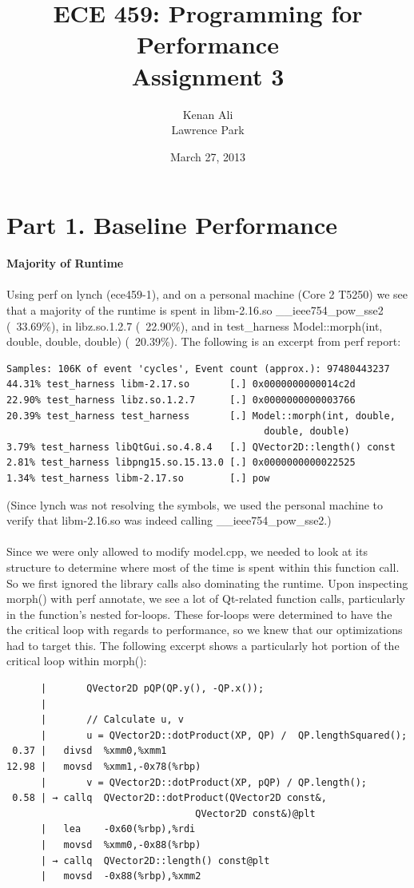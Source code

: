 \documentclass[12pt]{article}
\title{ECE 459: Programming for Performance\\Assignment 3}
\author{Kenan Ali\\Lawrence Park}
\date{March 27, 2013}
\begin{document}
\maketitle

\section*{Part 1. Baseline Performance}
{\bf Majority of Runtime}
\\
\\
Using perf on lynch (ece459-1), and on a personal machine (Core 2 T5250) we see that a majority of the
runtime is spent in libm-2.16.so \_\_ieee754\_pow\_sse2 (~33.69\%), in libz.so.1.2.7 (~22.90\%), and in
test\_harness Model::morph(int, double, double, double) (~20.39\%). The following is an excerpt from perf
report:
\\
\begin{lstlisting}
Samples: 106K of event 'cycles', Event count (approx.): 97480443237
44.31% test_harness libm-2.17.so       [.] 0x0000000000014c2d
22.90% test_harness libz.so.1.2.7      [.] 0x0000000000003766
20.39% test_harness test_harness       [.] Model::morph(int, double,
                                             double, double)
3.79% test_harness libQtGui.so.4.8.4   [.] QVector2D::length() const
2.81% test_harness libpng15.so.15.13.0 [.] 0x0000000000022525
1.34% test_harness libm-2.17.so        [.] pow
\end{lstlisting}

(Since lynch was not resolving the symbols, we used the personal machine to verify that libm-2.16.so was
indeed calling \_\_ieee754\_pow\_sse2.)
\\
\\
Since we were only allowed to modify model.cpp, we needed to look at its structure to determine where
most of the time is spent within this function call. So we first ignored the library calls also dominating the
runtime. Upon inspecting morph() with perf annotate, we see a lot of Qt-related function calls, particularly in
the function's nested for-loops. These for-loops were determined to have the the critical loop with regards
to performance, so we knew that our optimizations had to target this.
The following excerpt shows a particularly hot portion of the critical loop within morph():
\newpage
\begin{lstlisting}
      |       QVector2D pQP(QP.y(), -QP.x()); 
      |                                                  
      |       // Calculate u, v 
      |       u = QVector2D::dotProduct(XP, QP) /  QP.lengthSquared(); 
 0.37 |   divsd  %xmm0,%xmm1   
12.98 |   movsd  %xmm1,-0x78(%rbp) 
      |       v = QVector2D::dotProduct(XP, pQP) / QP.length(); 
 0.58 | → callq  QVector2D::dotProduct(QVector2D const&,
                                 QVector2D const&)@plt 
      |   lea    -0x60(%rbp),%rdi 
      |   movsd  %xmm0,-0x88(%rbp) 
      | → callq  QVector2D::length() const@plt 
      |   movsd  -0x88(%rbp),%xmm2 
\end{lstlisting}
\end{document}

